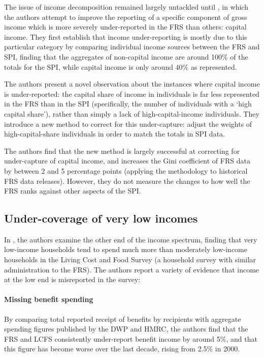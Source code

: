 \documentclass[twocolumn]{article}
\begin{document}
The issue of income decomposition remained largely untackled until \cite{frs_capital_income}, in which the authors attempt to improve the reporting of a specific component of gross income which is more severely under-reported in the FRS than others: capital income. They first establish that income under-reporting is mostly due to this particular category by comparing individual income sources between the FRS and SPI, finding that the aggregates of non-capital income are around 100\% of the totals for the SPI, while capital income is only around 40\% as represented.

The authors present a novel observation about the instances where capital income is under-reported: the capital share of income in individuals is far less represented in the FRS than in the SPI (specifically, the number of individuals with a `high capital share'), rather than simply a lack of high-capital-income individuals. They introduce a new method to correct for this under-capture: adjust the weights of high-capital-share individuals in order to match the totals in SPI data.

The authors find that the new method is largely successful at correcting for under-capture of capital income, and increases the Gini coefficient of FRS data by between 2 and 5 percentage points (applying the methodology to historical FRS data releases). However, they do not measure the changes to how well the FRS ranks against other aspects of the SPI.

\subsection{Under-coverage of very low incomes}

In \cite{brewer_low_income_coverage}, the authors examine the other end of the income spectrum, finding that very low-income households tend to spend much more than moderately low-income households in the Living Cost and Food Survey (a household survey with similar administration to the FRS). The authors report a variety of evidence that income at the low end is misreported in the survey:

\paragraph{Missing benefit spending} By comparing total reported receipt of benefits by recipients with aggregate spending figures published by the DWP and HMRC, the authors find that the FRS and LCFS consistently under-report benefit income by around 5\%, and that this figure has become worse over the last decade, rising from 2.5\% in 2000.
\end{document}
